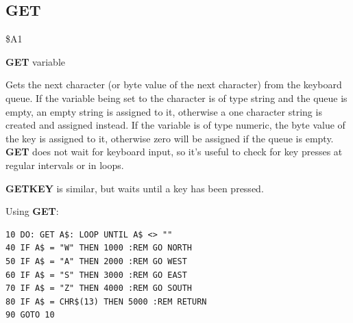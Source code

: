 \subsection{GET}
\begin{description}[leftmargin=2cm,style=nextline]
\item [Token:] \$A1
\item [Format:] {\bf GET} variable
\item [Usage:] Gets the next character (or byte value of the next character)
               from the keyboard queue.
               If the variable being set to the character is of type string and the queue is empty,
               an empty string is assigned to it,
               otherwise a one character string is created
               and assigned instead.
               If the variable is of type numeric, the byte value
               of the key is assigned to it, otherwise zero will be assigned if the queue is empty.
               {\bf GET} does not wait for keyboard
               input, so it's useful to check for key presses
               at regular intervals or in loops.

\item [Remarks:] {\bf GETKEY} is similar, but waits
                 until a key has been pressed.

\item [Example:] Using {\bf GET}:
\begin{tcolorbox}[colback=black,coltext=white]
\verbatimfont{\codefont}
\begin{verbatim}
10 DO: GET A$: LOOP UNTIL A$ <> ""
40 IF A$ = "W" THEN 1000 :REM GO NORTH
50 IF A$ = "A" THEN 2000 :REM GO WEST
60 IF A$ = "S" THEN 3000 :REM GO EAST
70 IF A$ = "Z" THEN 4000 :REM GO SOUTH
80 IF A$ = CHR$(13) THEN 5000 :REM RETURN
90 GOTO 10
\end{verbatim}
\end{tcolorbox}
\end{description}


\newpage
